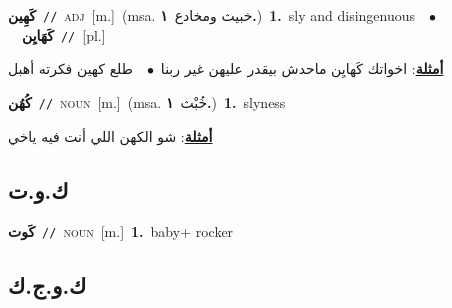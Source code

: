 \documentclass[10pt,a4paper,twoside]{article} %
\begin{document}
\begin{multicols}{2}
{\setlength\topsep{0pt}\textbf{\foreignlanguage{arabic}{كَهِين}}\ {\color{gray}\texttt{//}\color{black}}\ \textsc{adj}\ [m.]\ \color{gray}(msa. \foreignlanguage{arabic}{خبيث ومخادع}~\foreignlanguage{arabic}{\textbf{١.}})\color{black}\ \textbf{1.}~sly and disingenuous\ \ $\bullet$\ \ \setlength\topsep{0pt}\textbf{\foreignlanguage{arabic}{كَهَايِن}}\ {\color{gray}\texttt{//}\color{black}}\ [pl.]\  \begin{flushright}\color{gray}\foreignlanguage{arabic}{\textbf{\underline{\foreignlanguage{arabic}{أمثلة}}}: اخواتك كَهايِن ماحدش بيقدر عليهن غير ربنا\ $\bullet$\ \  طلع كهين فكرته أهبل}\end{flushright}\color{black}} \vspace{2mm}

{\setlength\topsep{0pt}\textbf{\foreignlanguage{arabic}{كُهُن}}\ {\color{gray}\texttt{//}\color{black}}\ \textsc{noun}\ [m.]\ \color{gray}(msa. \foreignlanguage{arabic}{خُبْث}~\foreignlanguage{arabic}{\textbf{١.}})\color{black}\ \textbf{1.}~slyness\  \begin{flushright}\color{gray}\foreignlanguage{arabic}{\textbf{\underline{\foreignlanguage{arabic}{أمثلة}}}: شو الكهن اللي أنت فيه ياخي}\end{flushright}\color{black}} \vspace{2mm}

\vspace{-3mm}
\subsection*{\color{blue}\foreignlanguage{arabic}{ك.و.ت}\color{blue}{}} 

{\setlength\topsep{0pt}\textbf{\foreignlanguage{arabic}{كَوت}}\ {\color{gray}\texttt{//}\color{black}}\ \textsc{noun}\ [m.]\ \textbf{1.}~baby+ rocker\ } \vspace{2mm}

\vspace{-3mm}
\subsection*{\color{blue}\foreignlanguage{arabic}{ك.و.ج.ك}\color{blue}{}} 


\end{multicols}
\end{document}
